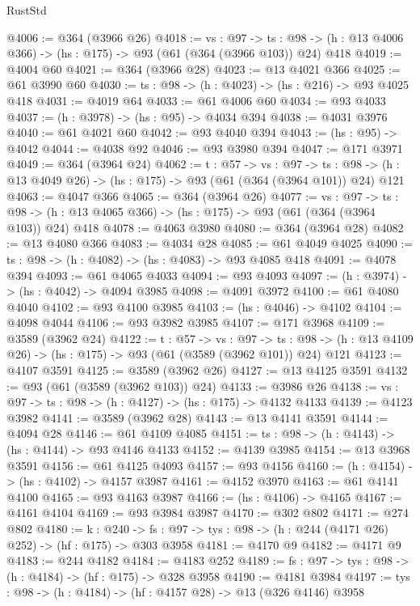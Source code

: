 \begin{lexlean}{RustStd}
\begin{coremodule}
@4006 := @364 (@3966 @26)
@4018 := {vs : @97} ->
  {ts : @98} -> (h : @13 @4006 @366) -> (hs : @175) -> @93 (@61 (@364 (@3966 @103)) @24) @418
@4019 := @4004 @60
@4021 := @364 (@3966 @28)
@4023 := @13 @4021 @366
@4025 := @61 @3990 @60
@4030 := {ts : @98} -> (h : @4023) -> (hs : @216) -> @93 @4025 @418
@4031 := @4019 @64
@4033 := @61 @4006 @60
@4034 := @93 @4033
@4037 := (h : @3978) -> (hs : @95) -> @4034 @394
@4038 := @4031 @3976
@4040 := @61 @4021 @60
@4042 := @93 @4040 @394
@4043 := (hs : @95) -> @4042
@4044 := @4038 @92
@4046 := @93 @3980 @394
@4047 := @171 @3971
@4049 := @364 (@3964 @24)
@4062 := {t : @57} ->
  {vs : @97} ->
  {ts : @98} -> (h : @13 @4049 @26) -> (hs : @175) -> @93 (@61 (@364 (@3964 @101)) @24) @121
@4063 := @4047 @366
@4065 := @364 (@3964 @26)
@4077 := {vs : @97} ->
  {ts : @98} -> (h : @13 @4065 @366) -> (hs : @175) -> @93 (@61 (@364 (@3964 @103)) @24) @418
@4078 := @4063 @3980
@4080 := @364 (@3964 @28)
@4082 := @13 @4080 @366
@4083 := @4034 @28
@4085 := @61 @4049 @4025
@4090 := {ts : @98} -> (h : @4082) -> (hs : @4083) -> @93 @4085 @418
@4091 := @4078 @394
@4093 := @61 @4065 @4033
@4094 := @93 @4093
@4097 := (h : @3974) -> (hs : @4042) -> @4094 @3985
@4098 := @4091 @3972
@4100 := @61 @4080 @4040
@4102 := @93 @4100 @3985
@4103 := (hs : @4046) -> @4102
@4104 := @4098 @4044
@4106 := @93 @3982 @3985
@4107 := @171 @3968
@4109 := @3589 (@3962 @24)
@4122 := {t : @57} ->
  {vs : @97} ->
  {ts : @98} -> (h : @13 @4109 @26) -> (hs : @175) -> @93 (@61 (@3589 (@3962 @101)) @24) @121
@4123 := @4107 @3591
@4125 := @3589 (@3962 @26)
@4127 := @13 @4125 @3591
@4132 := @93 (@61 (@3589 (@3962 @103)) @24)
@4133 := @3986 @26
@4138 := {vs : @97} -> {ts : @98} -> (h : @4127) -> (hs : @175) -> @4132 @4133
@4139 := @4123 @3982
@4141 := @3589 (@3962 @28)
@4143 := @13 @4141 @3591
@4144 := @4094 @28
@4146 := @61 @4109 @4085
@4151 := {ts : @98} -> (h : @4143) -> (hs : @4144) -> @93 @4146 @4133
@4152 := @4139 @3985
@4154 := @13 @3968 @3591
@4156 := @61 @4125 @4093
@4157 := @93 @4156
@4160 := (h : @4154) -> (hs : @4102) -> @4157 @3987
@4161 := @4152 @3970
@4163 := @61 @4141 @4100
@4165 := @93 @4163 @3987
@4166 := (hs : @4106) -> @4165
@4167 := @4161 @4104
@4169 := @93 @3984 @3987
@4170 := @302 @802
@4171 := @274 @802
@4180 := {k : @240} ->
  {fs : @97} -> {tys : @98} -> (h : @244 (@4171 @26) @252) -> (hf : @175) -> @303 @3958
@4181 := @4170 @9
@4182 := @4171 @9
@4183 := @244 @4182
@4184 := @4183 @252
@4189 := {fs : @97} -> {tys : @98} -> (h : @4184) -> (hf : @175) -> @328 @3958
@4190 := @4181 @3984
@4197 := {tys : @98} -> (h : @4184) -> (hf : @4157 @28) -> @13 (@326 @4146) @3958

\end{coremodule}
\end{lexlean}
